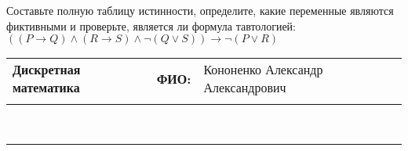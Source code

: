 \documentclass[10pt]{exam}
\newcommand{\class}{Дискретная математика}
\newcommand{\examdate}{}
\begin{document}
\begin{questions}
\begin{enumerate} [a)]
\end{enumerate}\question Составьте полную таблицу истинности, определите, какие переменные являются фиктивными и проверьте, является ли формула тавтологией:
$((P \rightarrow Q) \land (R \rightarrow S) \land \neg (Q \lor S)) \rightarrow \neg (P \lor R)$

\end{questions}
\newpage
\begin{flushright}
\begin{tabular}{p{2.8in} r l}
\textbf{\class} & \textbf{ФИО:} &Кононенко Александр Александрович
\\

\textbf{\examdate} &&\\
\end{tabular}\\
\end{flushright}
\rule[1ex]{\textwidth}{.1pt}
\end{document}

